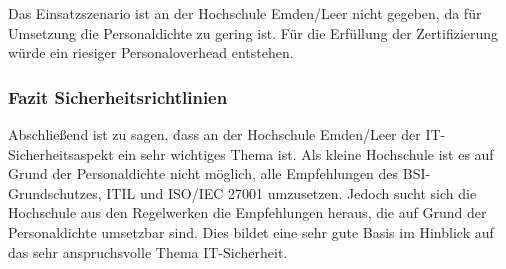 Das Einsatzszenario ist an der Hochschule Emden/Leer nicht gegeben, da für Umsetzung die Personaldichte zu gering ist. Für die Erfüllung der Zertifizierung würde ein riesiger Personaloverhead entstehen.

\subsubsection{Fazit Sicherheitsrichtlinien}
Abschließend ist zu sagen, dass an der Hochschule Emden/Leer der IT-Sicherheitsaspekt ein sehr wichtiges Thema ist. Als kleine Hochschule ist es auf Grund der Personaldichte nicht möglich, alle Empfehlungen des BSI-Grundschutzes, ITIL und ISO/IEC 27001 umzusetzen. Jedoch sucht sich die Hochschule aus den Regelwerken die Empfehlungen heraus, die auf Grund der Personaldichte umsetzbar sind.  Dies bildet eine sehr gute Basis im Hinblick auf das sehr anspruchsvolle Thema IT-Sicherheit.

